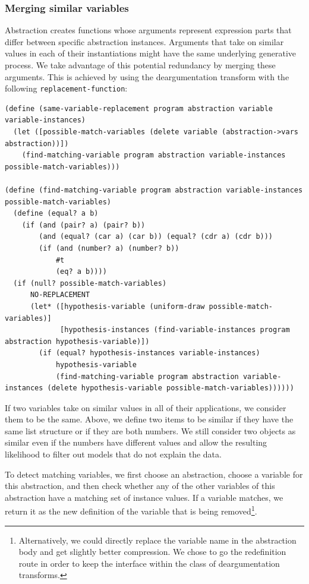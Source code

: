 \documentclass[a4paper,10pt]{article}
\begin{document}
\subsubsection{Merging similar variables}
Abstraction creates functions whose arguments represent expression parts that differ between specific abstraction instances.  Arguments that take on similar values in each of their instantiations might have the same underlying generative process.  We take advantage of this potential redundancy by merging these arguments.  This is achieved by using the deargumentation transform with the following \texttt{replacement-function}:
\begin{lstlisting}[frame=trbl]
(define (same-variable-replacement program abstraction variable variable-instances)
  (let ([possible-match-variables (delete variable (abstraction->vars abstraction))])
    (find-matching-variable program abstraction variable-instances possible-match-variables)))

(define (find-matching-variable program abstraction variable-instances possible-match-variables)
  (define (equal? a b) 
    (if (and (pair? a) (pair? b)) 
        (and (equal? (car a) (car b)) (equal? (cdr a) (cdr b))) 
        (if (and (number? a) (number? b))
            #t
            (eq? a b)))) 
  (if (null? possible-match-variables)
      NO-REPLACEMENT
      (let* ([hypothesis-variable (uniform-draw possible-match-variables)]
             [hypothesis-instances (find-variable-instances program abstraction hypothesis-variable)])
        (if (equal? hypothesis-instances variable-instances)
            hypothesis-variable
            (find-matching-variable program abstraction variable-instances (delete hypothesis-variable possible-match-variables))))))
\end{lstlisting}

If two variables take on similar values in all of their applications, we consider them to be the same.  Above, we define two items to be similar if they have the same list structure or if they are both numbers.  We still consider two objects as similar even if the numbers have different values and allow the resulting likelihood to filter out models that do not explain the data.

To detect matching variables, we first choose an abstraction, choose a variable for this abstraction, and then check whether any of the other variables of this abstraction have a matching set of instance values. If a variable matches, we return it as the new definition of the variable that is being removed\footnote{Alternatively, we could directly replace the variable name in the abstraction body and get slightly better compression. We chose to go the redefinition route in order to keep the interface within the class of deargumentation transforms.}.
\end{document}
